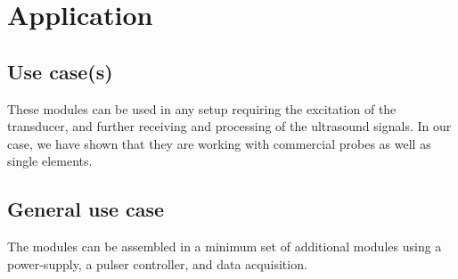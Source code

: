 \documentclass[letterpaper, 10 pt, conference]{ieeeconf} %
\begin{document}
\section{Application}

\subsection{Use case(s)}

These modules can be used in any setup requiring the excitation of the transducer, and further receiving and processing of the ultrasound signals. In our case, we have shown that they are working with commercial probes as well as single elements.

\subsection{General use case}

The modules can be assembled in a minimum set of additional modules using a power-supply, a pulser controller, and data acquisition.
\end{document}
